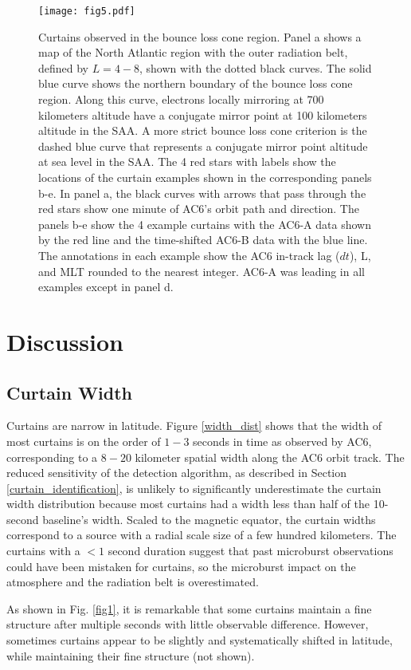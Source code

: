 \documentclass[draft]{agujournal2019}
\begin{document}
\begin{figure}
\texttt{[image: fig5.pdf]}
\caption{Curtains observed in the bounce loss cone region. Panel a shows a map of the North Atlantic region with the outer radiation belt, defined by $L=4-8$, shown with the dotted black curves. The solid blue curve shows the northern boundary of the bounce loss cone region. Along this curve, electrons locally mirroring at 700 kilometers altitude have a conjugate mirror point at 100 kilometers altitude in the SAA. A more strict bounce loss cone criterion is the dashed blue curve that represents a conjugate mirror point altitude at sea level in the SAA. The 4 red stars with labels show the locations of the curtain examples shown in the corresponding panels b-e. In panel a, the black curves with arrows that pass through the red stars show one minute of AC6's orbit path and direction. The panels b-e show the 4 example curtains with the AC6-A data shown by the red line and the time-shifted AC6-B data with the blue line. The annotations in each example show the AC6 in-track lag ($dt$), L, and MLT rounded to the nearest integer. AC6-A was leading in all examples except in panel d.}
\label{fig3}
\end{figure}

\section{Discussion} \label{discussion}
\subsection{Curtain Width}
Curtains are narrow in latitude. Figure \ref{width_dist} shows that the width of most curtains is on the order of $1-3$ seconds in time as observed by AC6, corresponding to a $8-20$ kilometer spatial width along the AC6 orbit track. The reduced sensitivity of the detection algorithm, as described in Section \ref{curtain_identification}, is unlikely to significantly underestimate the curtain width distribution because most curtains had a width less than half of the 10-second baseline's width. Scaled to the magnetic equator, the curtain widths correspond to a source with a radial scale size of a few hundred kilometers. The curtains with a $< 1$ second duration suggest that past microburst observations could have been mistaken for curtains, so the microburst impact on the atmosphere and the radiation belt is overestimated.

As shown in Fig. \ref{fig1}, it is remarkable that some curtains maintain a fine structure after multiple seconds with little observable difference. However, sometimes curtains appear to be slightly and systematically shifted in latitude, while maintaining their fine structure (not shown).
\end{document}
